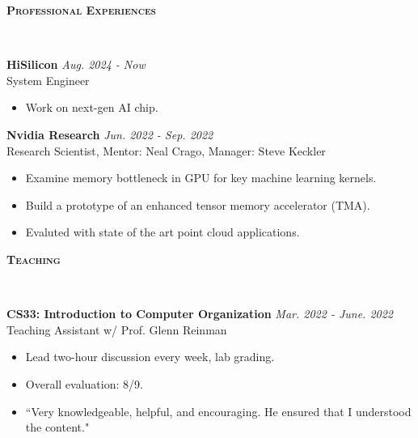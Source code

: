 \documentclass[a4paper]{article}
\newenvironment{changemargin}[2]{%
  \begin{list}{}{%
    \setlength{\topsep}{0pt}%
    \setlength{\leftmargin}{#1}%
    \setlength{\rightmargin}{#2}%
    \setlength{\listparindent}{\parindent}%
    \setlength{\itemindent}{\parindent}%
    \setlength{\parsep}{\parskip}%
  }%
  \item[]}{\end{list}
}
\newcommand{\lineover}{
	\begin{changemargin}{-0.05in}{-0.05in}
		\vspace*{-8pt}
		\hrulefill \\
		\vspace*{-2pt}
	\end{changemargin}
}
\newcommand{\header}[1]{
	\begin{changemargin}{-0.5in}{-0.5in}
		\scshape{\large \textbf{#1}}\\
  	\lineover
	\end{changemargin}
}
\newenvironment{body} {
	\vspace*{-16pt}
	\begin{changemargin}{-0.5in}{-0.5in}
  }	
	{\end{changemargin}
}
\begin{document}
\header{Professional Experiences}

\begin{body}
	\vspace{14pt}
	\textbf{HiSilicon} \hfill \emph{Aug. 2024 - Now} \\
	System Engineer
	\begin{itemize}
	\itemsep 0pt
	\item Work on next-gen AI chip.
	\end{itemize}
	\smallskip

	\textbf{Nvidia Research} \hfill \emph{Jun. 2022 - Sep. 2022} \\
	Research Scientist, Mentor: Neal Crago, Manager: Steve Keckler
	\begin{itemize}
	\itemsep 0pt
	\item Examine memory bottleneck in GPU for key machine learning kernels.
	\item Build a prototype of an enhanced tensor memory accelerator (TMA).
	\item Evaluted with state of the art point cloud applications.
	\end{itemize}
	\smallskip


\end{body}
\smallskip
\smallskip

\header{Teaching}

\begin{body}
	\vspace{14pt}
	\textbf{CS33: Introduction to Computer Organization} \hfill \emph{Mar. 2022 - June. 2022} \\
	Teaching Assistant w/ Prof. Glenn Reinman
	\begin{itemize}
	\itemsep 0pt
	\item Lead two-hour discussion every week, lab grading.
	\item Overall evaluation: 8/9.
	\item ``Very knowledgeable, helpful, and encouraging. He ensured that I understood the content."
	\end{itemize}
	\smallskip

\end{body}
\smallskip
\smallskip
\end{document}
